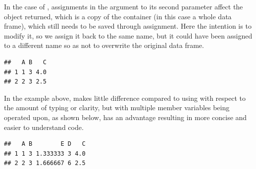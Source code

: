 \documentclass[krantz2]{krantz}\usepackage{knitr}
\begin{document}
\begin{explainbox}
In the case of , assignments in the argument to its second parameter affect the object returned, which is a copy of the container (in this case a whole data frame), which still needs to be saved through assignment. Here the intention is to modify it, so we assign it back to the same name, but it could have been assigned to a different name so as not to overwrite the original data frame.

\begin{knitrout}\footnotesize
{}\color{fgcolor}\begin{kframe}
\begin{alltt}
\hlopt{$} \hlkwb{<-} 
 \hlkwb{<-}  \hlkwb{<-}  \hlopt{+}  \hlopt{/} 
 \hlstd{)}
\end{alltt}
\begin{verbatim}
##   A B   C
## 1 1 3 4.0
## 2 2 3 2.5
\end{verbatim}
\end{kframe}
\end{knitrout}
In the example above,  makes little difference compared to using  with respect to the amount of typing or clarity, but with multiple member variables being operated upon, as shown below,  has an advantage resulting in more concise and easier to understand code.

\begin{knitrout}\footnotesize
{}\color{fgcolor}\begin{kframe}
\begin{alltt}
\hlopt{$} \hlkwb{<-} 
 \hlkwb{<-} 
                            \hlkwb{<-}  \hlopt{+}  \hlopt{/} 
                             \hlkwb{<-}  \hlopt{*} 
                             \hlkwb{<-}  \hlopt{/}  \hlopt{+} \hlstd{\}}
                           \hlstd{)}
 \hlstd{)}
\end{alltt}
\begin{verbatim}
##   A B        E D   C
## 1 1 3 1.333333 3 4.0
## 2 2 3 1.666667 6 2.5
\end{verbatim}
\end{kframe}
\end{knitrout}


\end{explainbox}
\end{document}

